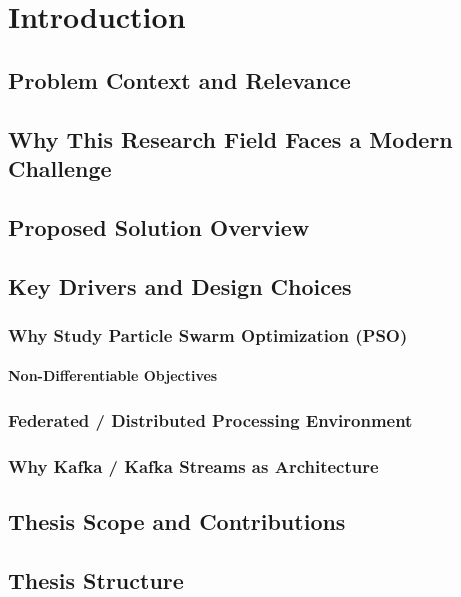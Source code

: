 \chapter{Introduction}

\section{Problem Context and Relevance}

\section{Why This Research Field Faces a Modern Challenge}

\section{Proposed Solution Overview}

\section{Key Drivers and Design Choices}
\subsection{Why Study Particle Swarm Optimization (PSO)}
\subsubsection{Non-Differentiable Objectives}

\subsection{Federated / Distributed Processing Environment}

\subsection{Why Kafka / Kafka Streams as Architecture}

\section{Thesis Scope and Contributions}

\section{Thesis Structure}
